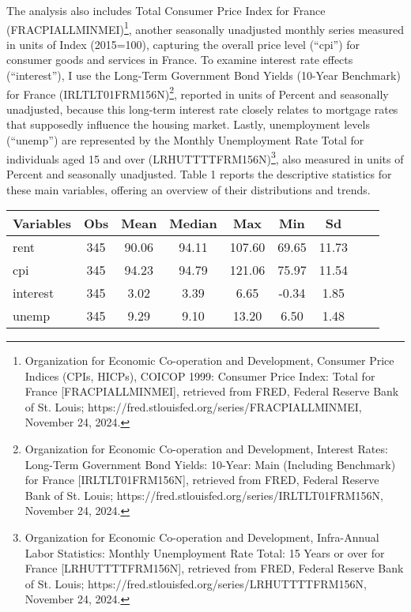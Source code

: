 \documentclass[12pt, times]{article}
\renewcommand{\baselinestretch}{1.5}
\begin{document}
The analysis also includes Total Consumer Price Index for France (FRACPIALLMINMEI)\footnote{Organization for Economic Co-operation and Development, Consumer Price Indices (CPIs, HICPs), COICOP 1999: Consumer Price Index: Total for France [FRACPIALLMINMEI], retrieved from FRED, Federal Reserve Bank of St. Louis; https://fred.stlouisfed.org/series/FRACPIALLMINMEI, November 24, 2024.}, another seasonally unadjusted monthly series measured in units of Index (2015=100), capturing the overall price level (``cpi'') for consumer goods and services in France. To examine interest rate effects (``interest''), I use the Long-Term Government Bond Yields (10-Year Benchmark) for France (IRLTLT01FRM156N)\footnote{Organization for Economic Co-operation and Development, Interest Rates: Long-Term Government Bond Yields: 10-Year: Main (Including Benchmark) for France [IRLTLT01FRM156N], retrieved from FRED, Federal Reserve Bank of St. Louis; https://fred.stlouisfed.org/series/IRLTLT01FRM156N, November 24, 2024.}, reported in units of Percent and seasonally unadjusted, because this long-term interest rate closely relates to mortgage rates that supposedly influence the housing market. Lastly, unemployment levels (``unemp'') are represented by the Monthly Unemployment Rate Total for individuals aged 15 and over (LRHUTTTTFRM156N)\footnote{Organization for Economic Co-operation and Development, Infra-Annual Labor Statistics: Monthly Unemployment Rate Total: 15 Years or over for France [LRHUTTTTFRM156N], retrieved from FRED, Federal Reserve Bank of St. Louis; https://fred.stlouisfed.org/series/LRHUTTTTFRM156N, November 24, 2024.}, also measured in units of Percent and seasonally unadjusted. Table 1 reports the descriptive statistics for these main variables, offering an overview of their distributions and trends.

\renewcommand{\baselinestretch}{1.0}
\begin{scriptsize}
  \begin{center}
    \tabcolsep 20pt
    \begin{tabular}{lcccccccc}
      \toprule
      Variables & Obs & Mean  & Median & Max    & Min   & Sd    \\
      \midrule
      rent      & 345 & 90.06 & 94.11  & 107.60 & 69.65 & 11.73 \\
      cpi       & 345 & 94.23 & 94.79  & 121.06 & 75.97 & 11.54 \\
      interest  & 345 & 3.02  & 3.39   & 6.65   & -0.34 & 1.85  \\
      unemp     & 345 & 9.29  & 9.10   & 13.20  & 6.50  & 1.48  \\
      \bottomrule
    \end{tabular}
  \end{center}
\end{scriptsize}
\end{document}
